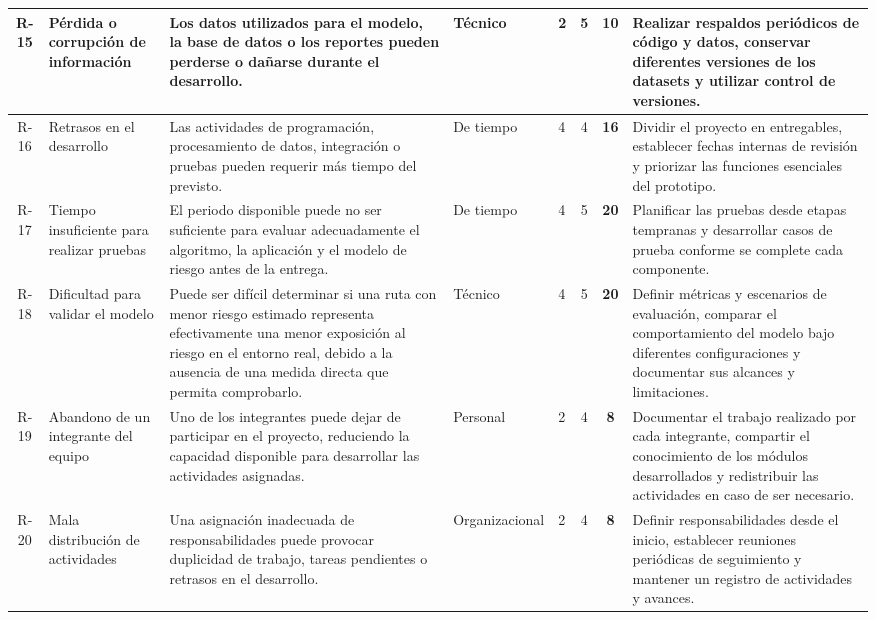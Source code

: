 \begin{landscape}
\begin{longtable}{|c|p{3cm}|p{5cm}|p{2cm}|p{1.1cm}|c|c|p{6cm}|}
R-15 & Pérdida o corrupción de información & Los datos utilizados para el modelo, la base de datos o los reportes pueden perderse o dañarse durante el desarrollo. & Técnico & 2 & 5 & \cellcolor{riskOrange} \textbf{10} & Realizar respaldos periódicos de código y datos, conservar diferentes versiones de los datasets y utilizar control de versiones. \\ \hline

R-16 & Retrasos en el desarrollo & Las actividades de programación, procesamiento de datos, integración o pruebas pueden requerir más tiempo del previsto. & De tiempo & 4 & 4 & \cellcolor{riskRed} \textbf{16} & Dividir el proyecto en entregables, establecer fechas internas de revisión y priorizar las funciones esenciales del prototipo. \\ \hline

R-17 & Tiempo insuficiente para realizar pruebas & El periodo disponible puede no ser suficiente para evaluar adecuadamente el algoritmo, la aplicación y el modelo de riesgo antes de la entrega. & De tiempo & 4 & 5 & \cellcolor{riskRed} \textbf{20} & Planificar las pruebas desde etapas tempranas y desarrollar casos de prueba conforme se complete cada componente. \\ \hline

R-18 & Dificultad para validar el modelo & Puede ser difícil determinar si una ruta con menor riesgo estimado representa efectivamente una menor exposición al riesgo en el entorno real, debido a la ausencia de una medida directa que permita comprobarlo. & Técnico & 4 & 5 & \cellcolor{riskRed} \textbf{20} & Definir métricas y escenarios de evaluación, comparar el comportamiento del modelo bajo diferentes configuraciones y documentar sus alcances y limitaciones. \\ \hline

R-19 & Abandono de un integrante del equipo & Uno de los integrantes puede dejar de participar en el proyecto, reduciendo la capacidad disponible para desarrollar las actividades asignadas. & Personal & 2 & 4 & \cellcolor{riskYellow} \textbf{8} & Documentar el trabajo realizado por cada integrante, compartir el conocimiento de los módulos desarrollados y redistribuir las actividades en caso de ser necesario. \\ \hline

R-20 & Mala distribución de actividades & Una asignación inadecuada de responsabilidades puede provocar duplicidad de trabajo, tareas pendientes o retrasos en el desarrollo. & Organiza\-cional & 2 & 4 & \cellcolor{riskYellow} \textbf{8} & Definir responsabilidades desde el inicio, establecer reuniones periódicas de seguimiento y mantener un registro de actividades y avances. \\ \hline


\end{longtable}
\end{landscape}
